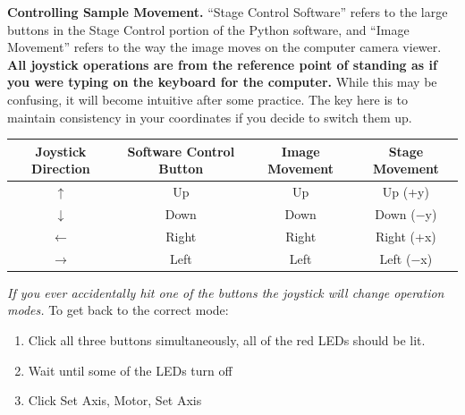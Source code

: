 \documentclass{../lab}
\begin{document}
\textbf{Controlling Sample Movement.} ``Stage Control Software'' refers to the large buttons in the Stage Control portion of the Python software, and ``Image Movement'' refers to the way the image moves on the computer camera viewer.  \textbf{All joystick operations are from the reference point of standing as if you were typing on the keyboard for the computer.} While this may be confusing, it will become intuitive after some practice. The key here is to maintain consistency in your coordinates if you decide to switch them up.



\begin{center}
    \begin{tabular}{c|c|c|c}
        Joystick Direction & Software Control Button & Image Movement & Stage Movement \\\hline
        $\uparrow$    & Up  & Up  & Up (+y) \\\hline
        $\downarrow$  & Down &  Down   & Down ($-$y) \\\hline
        $\leftarrow$ & Right   & Right  & Right (+x) \\\hline
        $\rightarrow$ & Left  & Left & Left ($-$x)
    \end{tabular}
\end{center}

\emph{If you ever accidentally hit one of the buttons the joystick will change operation modes.} To get back to the correct mode:

\begin{enumerate}
    \item Click all three buttons simultaneously, all of the red LEDs should be lit.

    \item Wait until some of the LEDs turn off

    \item Click Set Axis, Motor, Set Axis
\end{enumerate}
\end{document}

